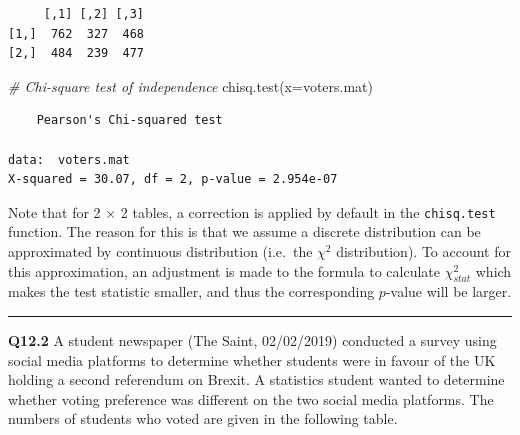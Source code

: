 \documentclass[
  oneside]{krantz}
\newenvironment{Shaded}{\begin{snugshade}}{\end{snugshade}}
\newcommand{\AttributeTok}[1]{\textcolor[rgb]{0.77,0.63,0.00}{#1}}
\newcommand{\CommentTok}[1]{\textcolor[rgb]{0.56,0.35,0.01}{\textit{#1}}}
\newcommand{\FunctionTok}[1]{\textcolor[rgb]{0.00,0.00,0.00}{#1}}
\newcommand{\NormalTok}[1]{#1}
\begin{document}
\begin{verbatim}
     [,1] [,2] [,3]
[1,]  762  327  468
[2,]  484  239  477
\end{verbatim}

\begin{Shaded}
\begin{Highlighting}[]
\CommentTok{\# Chi{-}square test of independence}
\FunctionTok{chisq.test}\NormalTok{(}\AttributeTok{x=}\NormalTok{voters.mat)}
\end{Highlighting}
\end{Shaded}

\begin{verbatim}
    Pearson's Chi-squared test

data:  voters.mat
X-squared = 30.07, df = 2, p-value = 2.954e-07
\end{verbatim}

Note that for 2 \(\times\) 2 tables, a correction is applied by default in the \texttt{chisq.test} function. The reason for this is that we assume a discrete distribution can be approximated by continuous distribution (i.e.~the \(\chi^2\) distribution). To account for this approximation, an adjustment is made to the formula to calculate \(\chi_{stat}^2\) which makes the test statistic smaller, and thus the corresponding \(p\)-value will be larger.

\begin{center}\rule{0.5\linewidth}{0.5pt}\end{center}

\textbf{Q12.2} A student newspaper (The Saint, 02/02/2019) conducted a survey using social media platforms to determine whether students were in favour of the UK holding a second referendum on Brexit. A statistics student wanted to determine whether voting preference was different on the two social media platforms. The numbers of students who voted are given in the following table.
\end{document}
